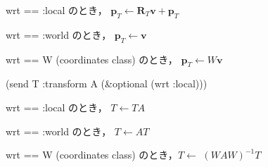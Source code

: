 wrt == :local のとき，
$\mathbf{p}_{T} \leftarrow \mathbf{R}_{T} \mathbf{v} + \mathbf{p}_{T}$

wrt == :world のとき，
$\mathbf{p}_{T} \leftarrow \mathbf{v}$

wrt == W (coordinates class) のとき，
$\mathbf{p}_{T} \leftarrow W\mathbf{v}$

\noindent
(send T :transform A (\&optional (wrt :local)))

wrt == :local のとき， $T \leftarrow TA$

wrt == :world のとき， $T \leftarrow AT$

wrt == W (coordinates class) のとき，$T \leftarrow$ $\left( WAW \right)^{-1} T$

